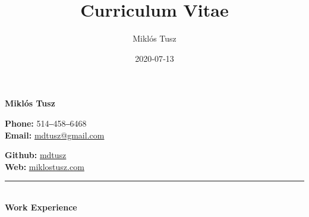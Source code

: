 \documentclass[10pt,notitlepage,oneside,draft]{article}
\title{Curriculum Vitae}
\author{Miklós Tusz}
\date{2020‐07‐13}
\begin{document}
\begin{flushleft}

  \huge
  \textbf{Miklós Tusz}

  \small

  \begin{multicols}{2}

    \begin{flushleft}
      \textbf{Phone:} 514‒458‒6468 \\
        \textbf{Email:} \href{mailto:mdtusz@gmail.com}{mdtusz@gmail.com} \\
    \end{flushleft}

    \begin{flushright}
        \textbf{Github:} \href{https://github.com/mdtusz}{mdtusz} \\
        \textbf{Web:} \href{https://www.miklostusz.com}{miklostusz.com} \\
    \end{flushright}

  \end{multicols}

  \rule{\textwidth}{1pt}\\[6pt]

  \large
  \textbf{Work Experience} \\
  \vspace{8pt}


\end{flushleft}
\end{document}
